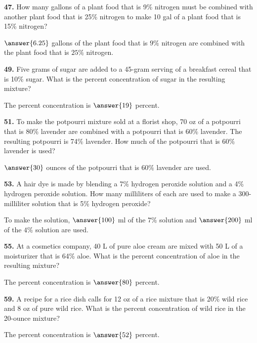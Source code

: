 \documentclass{ximera}
\begin{document}
\begin{problem}
\textbf{47.} How many gallons of a plant food that is 9\% nitrogen must be combined with
  another plant food that is 25\% nitrogen to make 10 gal of a plant food that is 15\%
  nitrogen?

\(\answer{6.25}\) gallons of the plant food that is \( 9 \% \) nitrogen are combined with the plant food that is \( 25 \% \) nitrogen.
\end{problem}

\begin{problem}
\textbf{49.} Five grams of sugar are added to a 45-gram serving of a breakfast cereal that is
  10\% sugar. What is the percent concentration of sugar in the resulting mixture?

The percent concentration is \( \answer{19}  \) percent.
\end{problem}

\begin{problem}
\textbf{51.} To make the potpourri mixture sold at a florist shop, 70 oz of a potpourri that is
  80\% lavender are combined with a potpourri that is 60\% lavender. The resulting
  potpourri is 74\% lavender. How much of the potpourri that is 60\% lavender is used?

\( \answer{30} \) ounces of the potpourri that is \( 60 \% \) lavender are used.
\end{problem}

\begin{problem}
\textbf{53.} A hair dye is made by blending a 7\% hydrogen peroxide solution and a 4\% hydrogen
  peroxide solution. How many milliliters of each are used to make a 300-milliliter
  solution that is 5\% hydrogen peroxide?

To make the solution, \( \answer{100} \) ml of the \( 7 \% \) solution and \( \answer{200} \) ml of the \( 4 \% \) solution are used.
\end{problem}

\begin{problem}
\textbf{55.} At a cosmetics company, 40 L of pure aloe cream are mixed with 50 L of a
  moisturizer that is 64\% aloe. What is the percent concentration of aloe in the
  resulting mixture?

The percent concentration is \( \answer{80} \) percent.
\end{problem}

\begin{problem}
\textbf{59.} A recipe for a rice dish calls for 12 oz of a rice mixture that is 20\% wild rice
  and 8 oz of pure wild rice. What is the percent concentration of wild rice in the
  20-ounce mixture?

The percent concentration is \( \answer{52} \) percent.
\end{problem}
\end{document}
